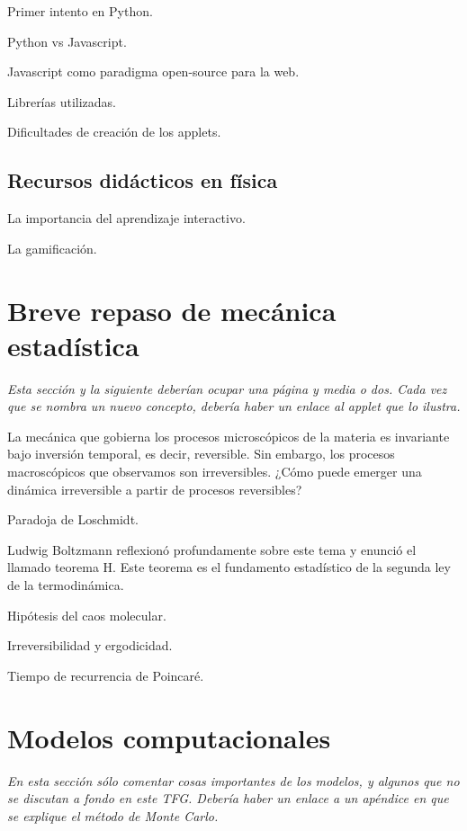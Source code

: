\documentclass[11pt, a4paper]{article} %
\theoremstyle{named}
\begin{document}
        Primer intento en Python.

        Python vs Javascript.

        Javascript como paradigma open-source para la web.

        Librerías utilizadas.

        Dificultades de creación de los applets.

    \subsection{Recursos didácticos en física}

        La importancia del aprendizaje interactivo.

        La gamificación.

\newpage
\section{Breve repaso de mecánica estadística}

    \textit{Esta sección y la siguiente deberían ocupar una página y media o dos. Cada vez que se nombra un nuevo concepto, debería haber un enlace al applet que lo ilustra.}

    La mecánica que gobierna los procesos microscópicos de la materia es invariante bajo inversión temporal, es decir, reversible. Sin embargo, los procesos macroscópicos que observamos son irreversibles. ¿Cómo puede emerger una dinámica irreversible a partir de procesos reversibles?

    Paradoja de Loschmidt.

    Ludwig Boltzmann reflexionó profundamente sobre este tema y enunció el llamado teorema H. Este teorema es el fundamento estadístico de la segunda ley de la termodinámica.

    Hipótesis del caos molecular.

    Irreversibilidad y ergodicidad.

    Tiempo de recurrencia de Poincaré.

    \cite{cineticos}

\section{Modelos computacionales}

    \textit{En esta sección sólo comentar cosas importantes de los modelos, y algunos que no se discutan a fondo en este TFG. Debería haber un enlace a un apéndice en que se explique el método de Monte Carlo.}
\end{document}

